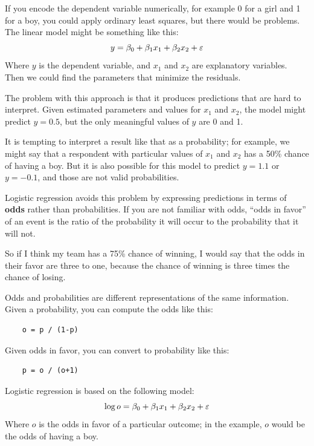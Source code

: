 \documentclass[12pt]{book}
\begin{document}
If you encode the dependent variable numerically, for example 0 for a
girl and 1 for a boy, you could apply ordinary least squares, but
there would be problems.  The linear model might be something like
this:
%
\[ y = \beta_0 + \beta_1 x_1 + \beta_2 x_2 + \varepsilon \]
%
Where $y$ is the dependent variable, and $x_1$ and $x_2$ are
explanatory variables.  Then we could find the parameters that
minimize the residuals.

The problem with this approach is that it produces predictions that
are hard to interpret.  Given estimated parameters and values for
$x_1$ and $x_2$, the model might predict $y=0.5$, but the only
meaningful values of $y$ are 0 and 1.

It is tempting to interpret a result like that as a probability; for
example, we might say that a respondent with particular values of
$x_1$ and $x_2$ has a 50\% chance of having a boy.  But it is also
possible for this model to predict $y=1.1$ or $y=-0.1$, and those
are not valid probabilities.

Logistic regression avoids this problem by expressing predictions in
terms of {\bf odds} rather than probabilities.  If you are not
familiar with odds, ``odds in favor'' of an event is the ratio of the
probability it will occur to the probability that it will not.

So if I think my team has a 75\% chance of winning, I would
say that the odds in their favor are three to one, because
the chance of winning is three times the chance of losing.

Odds and probabilities are different representations of the same
information.  Given a probability, you can compute the odds like this:

\begin{verbatim}
    o = p / (1-p)
\end{verbatim}

Given odds in favor, you can convert to
probability like this:

\begin{verbatim}
    p = o / (o+1)
\end{verbatim}

Logistic regression is based on the following model:
%
\[ \log o = \beta_0 + \beta_1 x_1 + \beta_2 x_2 + \varepsilon \]
%
Where $o$ is the odds in favor of a particular outcome; in the
example, $o$ would be the odds of having a boy.
\end{document}

